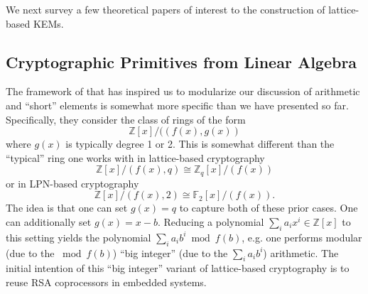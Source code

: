 We next survey a few theoretical papers of interest to the construction of lattice-based KEMs.

\subsection{Cryptographic Primitives from Linear Algebra}
\label{ssec: crypt-from-lin-alg}
The framework of \cite{cryptofromlinalg} that has inspired us to modularize our discussion of arithmetic and ``short'' elements is somewhat more specific than we have presented so far.
Specifically, they consider the class of rings of the form
\begin{equation*}
\mathbb{Z}[x] / ((f(x), g(x))
\end{equation*}
where $g(x)$ is typically degree 1 or 2.
This is somewhat different than the ``typical'' ring one works with in lattice-based cryptography
\begin{equation*}
\mathbb{Z}[x] / (f(x), q)\cong \mathbb{Z}_q[x] / (f(x))
\end{equation*}
or in LPN-based cryptography
\begin{equation*}
\mathbb{Z}[x] / (f(x), 2)\cong \mathbb{F}_2[x] / (f(x)).
\end{equation*}
The idea is that one can set $g(x) = q$ to capture both of these prior cases.
One can additionally set $g(x) = x - b$.
Reducing a polynomial $\sum_i a_i x^i\in\mathbb{Z}[x]$ to this setting yields the polynomial $\sum_i a_i b^i \bmod f(b)$, e.g. one performs modular (due to the $\bmod f(b)$) ``big integer'' (due to the $\sum_i a_i b^i$) arithmetic.
The initial intention of this ``big integer'' variant of lattice-based cryptography is to reuse RSA coprocessors in embedded systems.

